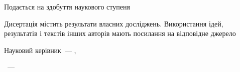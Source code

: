 \vspace{0pt plus1fill} %
Подається на здобуття наукового ступеня \thesisDegree

\vspace{0pt plus1fill} %
Дисертація містить результати власних досліджень. Використання ідей, результатів і текстів інших авторів мають посилання на відповідне джерело\\
\underline{\hspace{10em}} \thesisAuthorShort

\vspace{0pt plus1fill} %
Науковий керівник~--- \supervisorFio, \supervisorRegalia

\vspace{0pt plus4fill} %
\begin{center}%
{\thesisCity~--- \thesisYear}
\end{center}%
\newpage
